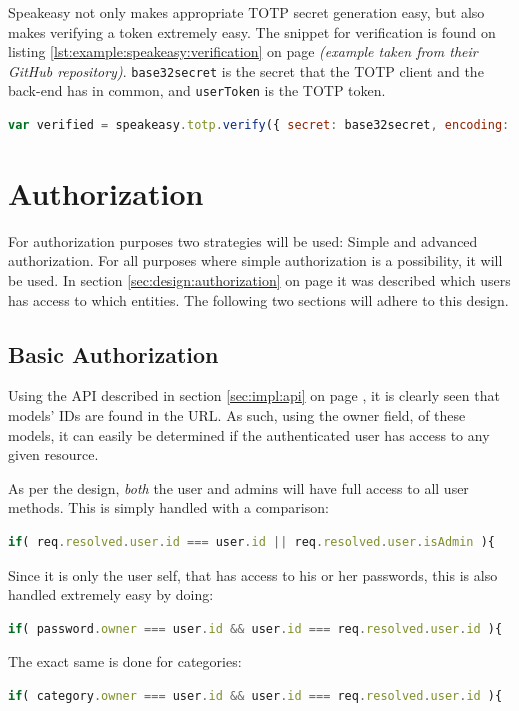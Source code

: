 			Speakeasy not only makes appropriate TOTP secret generation easy, but also makes verifying a token extremely easy. The snippet for verification is found on listing \ref{lst:example:speakeasy:verification} on page \pageref{lst:example:speakeasy:verification} \emph{(example taken from their GitHub repository)}. \verb=base32secret= is the secret that the TOTP client and the back-end has in common, and \verb=userToken= is the TOTP token.


			\begin{lstlisting}[gobble=16,language=JavaScript,caption={Verifying a TOTP token using Speakeasy},label={lst:example:speakeasy:verification}]
                var verified = speakeasy.totp.verify({ secret: base32secret, encoding: 'base32', token: userToken });
			\end{lstlisting}

	\section{Authorization}
		\label{sec:impl:authorization}
		For authorization purposes two strategies will be used: Simple and advanced authorization. For all purposes where simple authorization is a possibility, it will be used. In section \ref{sec:design:authorization} on page \pageref{sec:design:authorization} it was described which users has access to which entities. The following two sections will adhere to this design.

		\subsection{Basic Authorization}
			Using the API described in section \ref{sec:impl:api} on page \pageref{sec:impl:api}, it is clearly seen that models' IDs are found in the URL. As such, using the owner field, of these models, it can easily be determined if the authenticated user has access to any given resource.

			As per the design, \emph{both} the user and admins will have full access to all user methods. This is simply handled with a comparison:
			\begin{lstlisting}[gobble=16,language=JavaScript]
                if( req.resolved.user.id === user.id || req.resolved.user.isAdmin ){
			\end{lstlisting}

			Since it is only the user self, that has access to his or her passwords, this is also handled extremely easy by doing:
			\begin{lstlisting}[gobble=16,language=JavaScript]
                if( password.owner === user.id && user.id === req.resolved.user.id ){
			\end{lstlisting}
			The exact same is done for categories:
			\begin{lstlisting}[gobble=16,language=JavaScript]
                if( category.owner === user.id && user.id === req.resolved.user.id ){
			\end{lstlisting}

